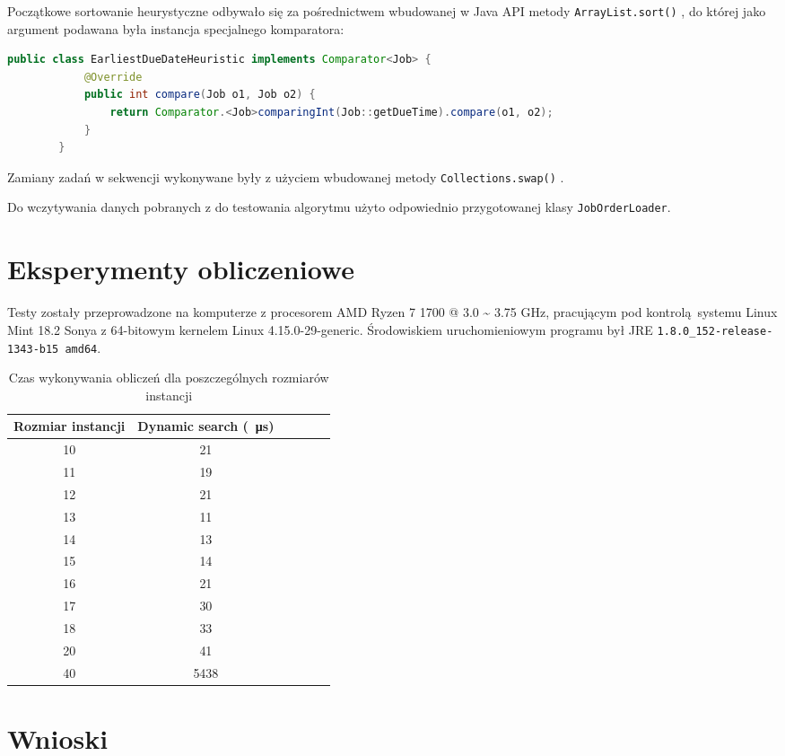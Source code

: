 \documentclass[polish,polish,a4paper]{article}
\begin{document}
	Początkowe sortowanie heurystyczne odbywało się za pośrednictwem wbudowanej w Java API metody\newline
	\texttt{ArrayList.sort()} \cite{JavaDocs}, do której jako argument podawana była instancja specjalnego komparatora:
	
	\begin{lstlisting}[language=Java]
		public class EarliestDueDateHeuristic implements Comparator<Job> {
			@Override
			public int compare(Job o1, Job o2) {
				return Comparator.<Job>comparingInt(Job::getDueTime).compare(o1, o2);
			}
		}
	\end{lstlisting}
	
	Zamiany zadań w sekwencji wykonywane były z użyciem wbudowanej metody \texttt{Collections.swap()} \cite{JavaDocs}.
	
	Do wczytywania danych pobranych z \cite{ORLib} do testowania algorytmu użyto odpowiednio przygotowanej klasy \texttt{JobOrderLoader}.
	
	
\section{Eksperymenty obliczeniowe}
	
	Testy zostały przeprowadzone na komputerze z procesorem AMD Ryzen 7 1700 @ 3.0 \textasciitilde{} 3.75 GHz, pracującym pod kontrolą systemu Linux Mint 18.2 Sonya z 64-bitowym kernelem Linux 4.15.0-29-generic. Środowiskiem uruchomieniowym programu był JRE \texttt{1.8.0\_152-release-1343-b15 amd64}.
	
	\begin{table}[h!]
		\centering
		\caption{Czas wykonywania obliczeń dla poszczególnych rozmiarów instancji}
		\label{tab:result}
		{\begin{tabular}{cccccc}
			\hline
			Rozmiar instancji & Dynamic search (\SI{}{\micro\second}) \\
			\hline
	        10 & 21 \\
			11 & 19 \\
			12 & 21 \\
			13 & 11 \\
			14 & 13 \\
			15 & 14 \\
			16 & 21 \\
			17 & 30 \\
			18 & 33 \\
			20 & 41 \\
			40 & 5438 \\
			\hline
		\end{tabular}}
	\end{table}
	
\section{Wnioski}
	
	
	


\end{document}
